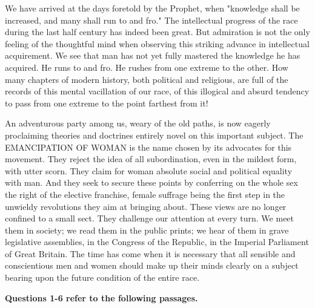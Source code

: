 \begin{linenumbers*}
\indent We have arrived at the days foretold by the Prophet, when "knowledge shall be increased, and many shall run to and fro." The intellectual progress of the race during the last half century has indeed been great. But admiration is not the only feeling of the thoughtful mind when observing this striking advance in intellectual acquirement. We see that man has not yet fully mastered the knowledge he has acquired. He runs to and fro. He rushes from one extreme to the other. How many chapters of modern history, both political and religious, are full of the records of this mental vacillation of our race, of this illogical and absurd tendency to pass from one extreme to the point farthest from it!

\indent An adventurous party among us, weary of the old paths, is now eagerly proclaiming theories and doctrines entirely novel on this important subject. The EMANCIPATION OF WOMAN is the name chosen by its advocates for this movement. They reject the idea of all subordination, even in the mildest form, with utter scorn. They claim for woman absolute social and political equality with man. And they seek to secure these points by conferring on the whole sex the right of the elective franchise, female suffrage being the first step in the unwieldy revolutions they aim at bringing about. These views are no longer confined to a small sect. They challenge our attention at every turn. We meet them in society; we read them in the public prints; we hear of them in grave legislative assemblies, in the Congress of the Republic, in the Imperial Parliament of Great Britain. The time has come when it is necessary that all sensible and conscientious men and women should make up their minds clearly on a subject bearing upon the future condition of the entire race.
\end{linenumbers*}

\bigskip
\textbf{Questions 1-6 refer to the following passages.}

\begin{linenumbers*}
\modulolinenumbers[5]
\indent
\end{linenumbers*}


